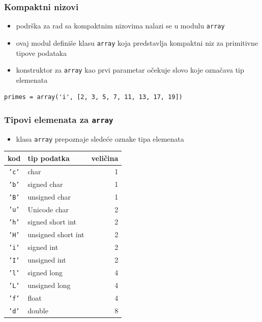 \documentclass[compress,aspectratio=169]{beamer}
\begin{document}
\begin{frame}[fragile]
  \frametitle{Kompaktni nizovi}
  \begin{itemize}
    \item podrška za rad sa kompaktnim nizovima nalazi se u modulu
    \texttt{array}
    \item ovaj modul definiše klasu \texttt{array} koja predstavlja kompaktni
    niz za primitivne tipove podataka
    \item konstruktor za \texttt{array} kao prvi parametar očekuje slovo koje
    označava tip elemenata
  \end{itemize}
\begin{verbatim}
primes = array('i', [2, 3, 5, 7, 11, 13, 17, 19])
\end{verbatim}
\end{frame}

\begin{frame}[fragile]
  \frametitle{Tipovi elemenata za \texttt{array}}
  \begin{itemize}
    \item klasa \texttt{array} prepoznaje sledeće oznake tipa elemenata
  \end{itemize}
\begin{center}
\begin{tabular}{clr}
\textbf{kod} & \textbf{tip podatka} & \textbf{veličina} \\
\hline \hline 
\texttt{'c'} & char & 1 \\ \hline 
\texttt{'b'} & signed char & 1 \\ \hline 
\texttt{'B'} & unsigned char & 1 \\ \hline
\texttt{'u'} & Unicode char & 2 \\ \hline
\texttt{'h'} & signed short int & 2 \\ \hline
\texttt{'H'} & unsigned short int & 2 \\ \hline
\texttt{'i'} & signed int & 2 \\ \hline
\texttt{'I'} & unsigned int & 2 \\ \hline
\texttt{'l'} & signed long & 4 \\ \hline
\texttt{'L'} & unsigned long & 4 \\ \hline
\texttt{'f'} & float & 4 \\ \hline
\texttt{'d'} & double & 8 \\ \hline
\end{tabular}
\end{center}
\end{frame}
\end{document}

